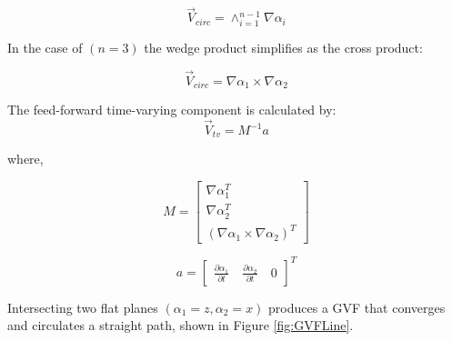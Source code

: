 \documentclass[conf]{new-aiaa}
\begin{document}
\begin{equation}
\vec{V}_{circ} =  \wedge_{i=1}^{n-1}\nabla\alpha_i 
\label{circOnly}
\end{equation}

In the case of $(n=3)$ the wedge product simplifies as the cross product:

\begin{equation}
\vec{V}_{circ} =  \nabla\alpha_1 \times \nabla\alpha_2 
\label{circOnlySimp}
\end{equation}

The feed-forward time-varying component is calculated by:
\begin{equation}
\label{tv}
\vec{V}_{tv} = M^{-1}a
\end{equation}

where,

\begin{equation}
\label{mMatrix}
M =\begin{bmatrix}
\nabla\alpha_1^T \\
\nabla\alpha_2^T \\
(\nabla\alpha_1 \times \nabla\alpha_2)^T
\end{bmatrix}
\end{equation}

\begin{equation}
\label{aVector}
a =\begin{bmatrix}
\frac{\partial \alpha_1}{\partial t} \quad   \frac{\partial \alpha_2}{\partial t} \quad   0
\end{bmatrix}^T
\end{equation}

Intersecting two flat planes $(\alpha_1 = z,\alpha_2 = x)$ produces a GVF that converges and circulates a straight path, shown in Figure \ref{fig:GVFLine}. 
\end{document}

